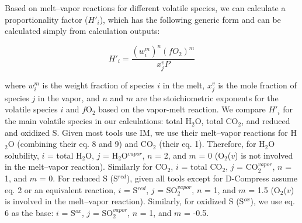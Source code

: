 \documentclass[draft, english]{volcanica-template}
\begin{document}
Based on melt–vapor reactions for different volatile species, we can calculate a proportionality factor ($H'_{i}$), which has the following generic form and can be calculated simply from calculation outputs:

\begin{equation}
    H'_{i} = \frac{\left( w^m_{i} \right)^n\left( fO_2 \right)^m}{x^v_{j}P}
    \label{eq:propfac}
\end{equation}

\noindent where $w^m_{i}$ is the weight fraction of species $i$ in the melt, ${x^v_{j}}$ is the mole fraction of species $j$ in the vapor, and $n$ and $m$ are the stoichiometric exponents for the volatile species $i$ and $f$O$_2$ based on the vapor-melt reaction. We compare $H'_{i}$ for the main volatile species in our calculations: total H$_2$O, total CO$_2$, and reduced and oxidized S. Given most tools use IM, we use their melt–vapor reactions for H$_2$O (combining their eq. 8 and 9) and CO$_2$ (their eq. 1). Therefore, for H$_2$O solubility, $i$ = total H$_2$O, $j$ = H$_2$O$^{vapor}$, $n$ = 2, and $m$ = 0 (O$_2$($v$) is not involved in the melt–vapor reaction). Similarly for CO$_2$, $i$ = total CO$_2$, $j$ = CO$_2^{vapor}$, $n$ = 1, and $m$ = 0. For reduced S (S$^{red}$), given all tools except for D-Compress assume eq. 2 or an equivalent reaction, $i$ = S$^{red}$, $j$ = SO$_2^{vapor}$, $n$ = 1, and $m$ = 1.5 (O$_2$($v$) is involved in the melt–vapor reaction). Similarly, for oxidized S (S$^{ox}$), we use eq. 6 as the base: $i$ = S$^{ox}$, $j$ = SO$_2^{vapor}$, $n$ = 1, and $m$ = -0.5. 
\end{document}
